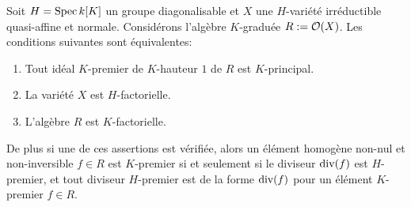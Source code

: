 \begin{prop}
Soit $H=\operatorname{Spec} k[K]$ un groupe diagonalisable et $X$ une $H$-variété irréductible quasi-affine et normale. Considérons l'algèbre $K$-graduée $R:=\mathcal{O}(X)$. Les conditions suivantes sont équivalentes: 
\begin{enumerate}
\item Tout idéal $K$-premier de $K$-hauteur $1$ de $R$ est $K$-principal.
\item La variété $X$ est $H$-factorielle.
\item L'algèbre $R$ est $K$-factorielle.
\end{enumerate}
De plus si une de ces assertions est vérifiée, alors un élément homogène non-nul et non-inversible $f\in R$ est $K$-premier si et seulement si le diviseur $\operatorname{div}(f)$ est $H$-premier, et tout diviseur $H$-premier est de la forme $\operatorname{div}(f)$ pour un élément $K$-premier $f\in R$.
\end{prop}
